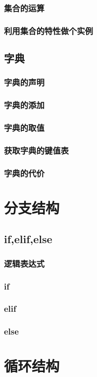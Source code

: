 \documentclass{book}
\begin{document}
\subsection{集合的运算}
\subsection{利用集合的特性做个实例}
\section{字典}
\subsection{字典的声明}
\subsection{字典的添加}
\subsection{字典的取值}
\subsection{获取字典的键值表}
\subsection{字典的代价}
\chapter{分支结构}
\section{if,elif,else}
\subsection{逻辑表达式}
\subsection{if}
\subsection{elif}
\subsection{else}
\chapter{循环结构}
\end{document}
